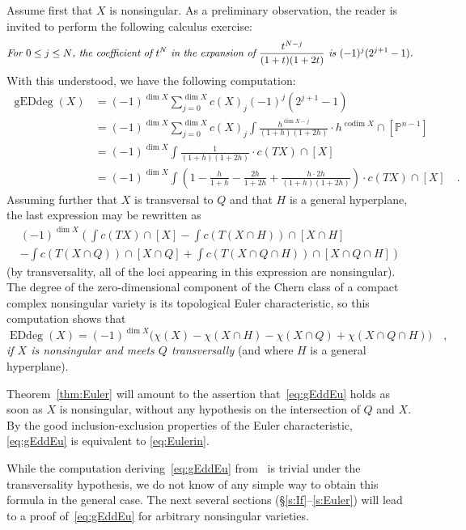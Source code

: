 \documentclass[11pt]{amsart}
\numberwithin{equation}{section}
\newcommand{\Pbb}{{\mathbb{P}}}
\DeclareMathOperator{\codim}{codim}
\DeclareMathOperator{\Edd}{EDdeg}
\DeclareMathOperator{\gEdd}{gEDdeg}
\begin{document}
Assume first that $X$ is nonsingular.
As a preliminary observation, the reader is invited to perform the following calculus
exercise:
\[
\text{\em For $0\le j\le N$, the coefficient of $t^N$ in the expansion of 
$\frac{t^{N-j}}{(1+t)(1+2t)}$ is 
$(-1)^j (2^{j+1}-1)$.}
\] 
With this understood, we have the following computation:
\begin{align*}
\gEdd(X) &= (-1)^{\dim X}\sum_{j=0}^{\dim X} c(X)_j (-1)^j (2^{j+1}-1) \\
&= (-1)^{\dim X}\sum_{j=0}^{\dim X} c(X)_j \int \frac{h^{\dim X-j}}{(1+h)(1+2h)} \cdot
h^{\codim X}\cap [\Pbb^{n-1}] \\
&= (-1)^{\dim X}\int \frac{1}{(1+h)(1+2h)}\cdot c(TX)\cap [X] \\
&= (-1)^{\dim X}\int \left(1-\frac{h}{1+h} -\frac{2h}{1+2h} + \frac{h\cdot 2h}{(1+h)(1+2h)}\right)
\cdot c(TX)\cap [X]\quad.
\end{align*}
Assuming further that $X$ is transversal to $Q$ and that $H$ is a general hyperplane,
the last expression may be rewritten as
\begin{multline*}
(-1)^{\dim X}\left(\int c(TX)\cap [X] - \int c(T(X\cap H))\cap [X\cap H] \right.\\
\left.- \int c(T(X\cap Q))\cap [X\cap Q] + \int c(T(X\cap Q\cap H))\cap [X\cap Q\cap H] 
\right)
\end{multline*}
(by transversality, all of the loci appearing in this expression are nonsingular). 
The degree of the zero-dimensional component of the Chern 
class of a compact complex nonsingular variety is its topological Euler characteristic, so this 
computation shows that
\begin{equation}\label{eq:gEddEu}
\Edd(X) = (-1)^{\dim X}\big(\chi(X)-\chi(X\cap H)-\chi(X\cap Q) + \chi(X\cap Q\cap H)\big)\quad,
\end{equation}
{\em if $X$ is nonsingular and meets $Q$ transversally\/}
(and where $H$ is a general hyperplane).

Theorem~\ref{thm:Euler} will amount to the assertion that~\eqref{eq:gEddEu} holds 
as soon as $X$ is nonsingular, without any hypothesis on the intersection of $Q$ 
and $X$. By the good inclusion-exclusion properties of the Euler characteristic,
\eqref{eq:gEddEu} is equivalent to \eqref{eq:Eulerin}.

While the computation deriving~\eqref{eq:gEddEu} 
from~\cite[Theorem~5.8]{MR3451425} is trivial under the transversality hypothesis, 
we do not know of any simple way 
to obtain this formula in the general case. The next several sections 
(\S\ref{s:If}--\ref{s:Euler}) will lead to a proof of~\eqref{eq:gEddEu} for arbitrary 
nonsingular varieties. 
\end{document}
